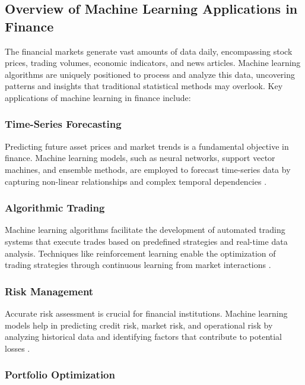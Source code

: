\subsection{Overview of Machine Learning Applications in Finance}

The financial markets generate vast amounts of data daily, encompassing stock prices, trading volumes, economic indicators, and news articles. Machine learning algorithms are uniquely positioned to process and analyze this data, uncovering patterns and insights that traditional statistical methods may overlook. Key applications of machine learning in finance include:

\subsubsection{Time-Series Forecasting}

Predicting future asset prices and market trends is a fundamental objective in finance. Machine learning models, such as neural networks, support vector machines, and ensemble methods, are employed to forecast time-series data by capturing non-linear relationships and complex temporal dependencies \cite{sezer2020financial}.

\subsubsection{Algorithmic Trading}

Machine learning algorithms facilitate the development of automated trading systems that execute trades based on predefined strategies and real-time data analysis. Techniques like reinforcement learning enable the optimization of trading strategies through continuous learning from market interactions \cite{nevmyvaka2006reinforcement, deng2016deep}.
\subsubsection{Risk Management}

Accurate risk assessment is crucial for financial institutions. Machine learning models help in predicting credit risk, market risk, and operational risk by analyzing historical data and identifying factors that contribute to potential losses \cite{lessmann2015benchmarking}.

\subsubsection{Portfolio Optimization}

